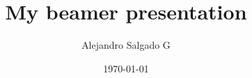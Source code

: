 \documentclass{beamer}
\begin{document}
\title{My beamer presentation}  
\author{Alejandro Salgado G}
\date{\today} 

\begin{frame}
\titlepage
\end{frame}
\end{document}
